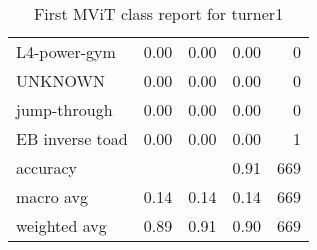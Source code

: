 \begin{table}[h!]
\begin{tabular}{|l|r|r|r|r|}
         L4-power-gym &      0.00 &     0.00 &     0.00 &        0 \\
              UNKNOWN &      0.00 &     0.00 &     0.00 &        0 \\
         jump-through &      0.00 &     0.00 &     0.00 &        0 \\
      EB inverse toad &      0.00 &     0.00 &     0.00 &        1 \\ \hline
             accuracy &           &          &     0.91 &      669 \\
            macro avg &      0.14 &     0.14 &     0.14 &      669 \\
         weighted avg &      0.89 &     0.91 &     0.90 &      669 \\
         \hline
    \end{tabular}
    \caption[Turner 1 class report]{First MViT class report for turner1}
    \label{tbl:mvit-first-class-reports-turner1}
\end{table}

